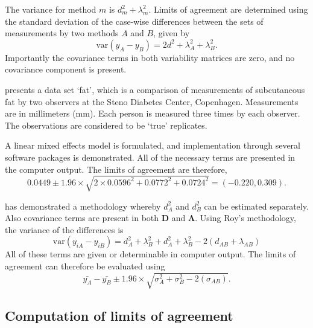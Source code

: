 \documentclass[12pt, a4paper]{report}
\theoremstyle{plain}
\theoremstyle{definition}
\theoremstyle{remark}
\begin{document}
	The variance for method $m$ is $d^2_{m}+\lambda^2_{m}$. Limits of agreement are determined using the standard deviation of the case-wise differences between the sets of measurements by two methods $A$ and $B$, given by
	\begin{equation}
	\mbox{var} (y_{A}-y_{B}) = 2d^2 + \lambda^2_{A}+ \lambda^2_{B}.
	\end{equation}
	Importantly the covariance terms in both variability matrices are zero, and no covariance component is present.
	
	\citet{BXC2008} presents a data set `fat', which is a comparison of measurements of subcutaneous fat
	by two observers at the Steno Diabetes Center, Copenhagen. Measurements are in millimeters
	(mm). Each person is measured three times by each observer. The observations are considered to be `true' replicates.
	
	A linear mixed effects model is formulated, and implementation through several software packages is demonstrated.
	All of the necessary terms are presented in the computer output. The limits of agreement are therefore,
	\begin{equation}
	0.0449  \pm 1.96 \times  \sqrt{2 \times 0.0596^2 + 0.0772^2 + 0.0724^2} = (-0.220,  0.309).
	\end{equation}
	
	\citet{ARoy2009} has demonstrated a methodology whereby $d^2_{A}$ and $d^2_{B}$ can be estimated separately. Also covariance terms are present in both $\boldsymbol{D}$ and $\boldsymbol{\Lambda}$. Using Roy's methodology, the variance of the differences is
	\begin{equation}
	\mbox{var} (y_{iA}-y_{iB})= d^2_{A} + \lambda^2_{B} + d^2_{A} + \lambda^2_{B} - 2(d_{AB} + \lambda_{AB})
	\end{equation}
	All of these terms are given or determinable in computer output.
	The limits of agreement can therefore be evaluated using
	\begin{equation}
	\bar{y_{A}}-\bar{y_{B}} \pm 1.96 \times \sqrt{ \sigma^2_{A} + \sigma^2_{B}  - 2(\sigma_{AB})}.
	\end{equation}
	
%	

	
	
	\subsection{Computation of limits of agreement }
	
\end{document}
